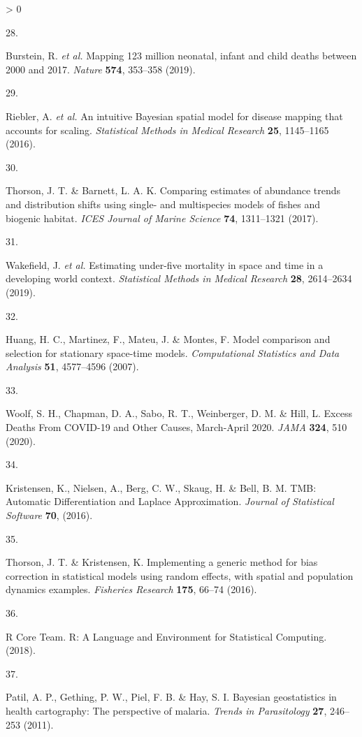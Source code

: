 \documentclass[
]{article}
\newlength{\cslhangindent}
\newlength{\csllabelwidth}
\newenvironment{CSLReferences}[2] %
 {%
  \setlength{\parindent}{0pt}
  \ifodd #1 \everypar{\setlength{\hangindent}{\cslhangindent}}\ignorespaces\fi
  \ifnum #2 > 0
  \setlength{\parskip}{#2\baselineskip}
  \fi
 }%
 {}
\newcommand{\CSLLeftMargin}[1]{\parbox[t]{\csllabelwidth}{#1}}
\newcommand{\CSLRightInline}[1]{\parbox[t]{\linewidth - \csllabelwidth}{#1}\break}
\begin{document}
\begin{CSLReferences}{0}{0}
\leavevmode\hypertarget{ref-Burstein2019}{}%
\CSLLeftMargin{28. }
\CSLRightInline{Burstein, R. \emph{et al.} {Mapping 123 million neonatal, infant and child deaths between 2000 and 2017}. \emph{Nature} \textbf{574}, 353--358 (2019).}

\leavevmode\hypertarget{ref-Riebler2016}{}%
\CSLLeftMargin{29. }
\CSLRightInline{Riebler, A. \emph{et al.} {An intuitive Bayesian spatial model for disease mapping that accounts for scaling}. \emph{Statistical Methods in Medical Research} \textbf{25}, 1145--1165 (2016).}

\leavevmode\hypertarget{ref-Thorson2017}{}%
\CSLLeftMargin{30. }
\CSLRightInline{Thorson, J. T. \& Barnett, L. A. K. {Comparing estimates of abundance trends and distribution shifts using single- and multispecies models of fishes and biogenic habitat}. \emph{ICES Journal of Marine Science} \textbf{74}, 1311--1321 (2017).}

\leavevmode\hypertarget{ref-Wakefield2019}{}%
\CSLLeftMargin{31. }
\CSLRightInline{Wakefield, J. \emph{et al.} {Estimating under-five mortality in space and time in a developing world context}. \emph{Statistical Methods in Medical Research} \textbf{28}, 2614--2634 (2019).}

\leavevmode\hypertarget{ref-Huang2007}{}%
\CSLLeftMargin{32. }
\CSLRightInline{Huang, H. C., Martinez, F., Mateu, J. \& Montes, F. {Model comparison and selection for stationary space-time models}. \emph{Computational Statistics and Data Analysis} \textbf{51}, 4577--4596 (2007).}

\leavevmode\hypertarget{ref-Woolf2020}{}%
\CSLLeftMargin{33. }
\CSLRightInline{Woolf, S. H., Chapman, D. A., Sabo, R. T., Weinberger, D. M. \& Hill, L. {Excess Deaths From COVID-19 and Other Causes, March-April 2020}. \emph{JAMA} \textbf{324}, 510 (2020).}

\leavevmode\hypertarget{ref-Kristensen2016}{}%
\CSLLeftMargin{34. }
\CSLRightInline{Kristensen, K., Nielsen, A., Berg, C. W., Skaug, H. \& Bell, B. M. {TMB: Automatic Differentiation and Laplace Approximation}. \emph{Journal of Statistical Software} \textbf{70}, (2016).}

\leavevmode\hypertarget{ref-Thorson2016}{}%
\CSLLeftMargin{35. }
\CSLRightInline{Thorson, J. T. \& Kristensen, K. {Implementing a generic method for bias correction in statistical models using random effects, with spatial and population dynamics examples}. \emph{Fisheries Research} \textbf{175}, 66--74 (2016).}

\leavevmode\hypertarget{ref-RCoreTeam2018}{}%
\CSLLeftMargin{36. }
\CSLRightInline{R Core Team. {R: A Language and Environment for Statistical Computing}. (2018).}

\leavevmode\hypertarget{ref-Patil2011}{}%
\CSLLeftMargin{37. }
\CSLRightInline{Patil, A. P., Gething, P. W., Piel, F. B. \& Hay, S. I. {Bayesian geostatistics in health cartography: The perspective of malaria}. \emph{Trends in Parasitology} \textbf{27}, 246--253 (2011).}

\end{CSLReferences}
\end{document}
